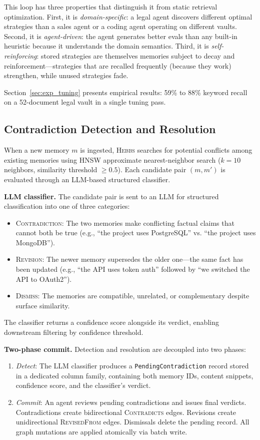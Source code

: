 \documentclass{article}
\begin{document}
This loop has three properties that distinguish it from static retrieval optimization. First, it is \emph{domain-specific}: a legal agent discovers different optimal strategies than a sales agent or a coding agent operating on different vaults. Second, it is \emph{agent-driven}: the agent generates better evals than any built-in heuristic because it understands the domain semantics. Third, it is \emph{self-reinforcing}: stored strategies are themselves memories subject to decay and reinforcement---strategies that are recalled frequently (because they work) strengthen, while unused strategies fade.

Section~\ref{sec:exp_tuning} presents empirical results: 59\% to 88\% keyword recall on a 52-document legal vault in a single tuning pass.

\subsection{Contradiction Detection and Resolution}
\label{sec:contradiction}

When a new memory $m$ is ingested, \textsc{Hebbs} searches for potential conflicts among existing memories using HNSW approximate nearest-neighbor search ($k{=}10$ neighbors, similarity threshold $\geq 0.5$). Each candidate pair $(m, m')$ is evaluated through an LLM-based structured classifier.

\textbf{LLM classifier.} The candidate pair is sent to an LLM for structured classification into one of three categories:
\begin{itemize}
    \item \textsc{Contradiction}: The two memories make conflicting factual claims that cannot both be true (e.g., ``the project uses PostgreSQL'' vs. ``the project uses MongoDB'').
    \item \textsc{Revision}: The newer memory supersedes the older one---the same fact has been updated (e.g., ``the API uses token auth'' followed by ``we switched the API to OAuth2'').
    \item \textsc{Dismiss}: The memories are compatible, unrelated, or complementary despite surface similarity.
\end{itemize}

The classifier returns a confidence score alongside its verdict, enabling downstream filtering by confidence threshold.

\textbf{Two-phase commit.} Detection and resolution are decoupled into two phases:
\begin{enumerate}
    \item \emph{Detect}: The LLM classifier produces a \texttt{PendingContradiction} record stored in a dedicated column family, containing both memory IDs, content snippets, confidence score, and the classifier's verdict.
    \item \emph{Commit}: An agent reviews pending contradictions and issues final verdicts. Contradictions create bidirectional \textsc{Contradicts} edges. Revisions create unidirectional \textsc{RevisedFrom} edges. Dismissals delete the pending record. All graph mutations are applied atomically via batch write.
\end{enumerate}
\end{document}
